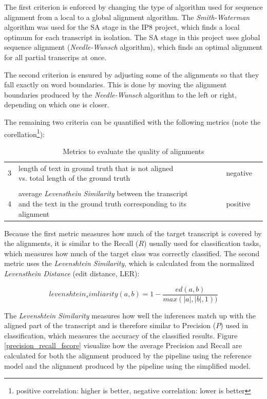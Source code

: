 The first criterion is enforced by changing the type of algorithm used for sequence alignment from a local to a global alignment algorithm. The \textit{Smith-Waterman} algorithm was used for the \ac{SA} stage in the IP8 project, which finds a local optimum for each transcript in isolation. The \ac{SA} stage in this project uses global sequence alignment (\textit{Needle-Wunsch} algorithm), which finds an optimal alignment for all partial transcrips at once.

The second criterion is ensured by adjusting some of the alignments so that they fall exactly on word boundaries. This is done by moving the alignment boundaries produced by the \textit{Needle-Wunsch} algorithm to the left or right, depending on which one is closer. 

The remaining two criteria can be quantified with the following metrics (note the corellation\footnote{positive correlation: higher is better, negative correlation: lower is better}):

\begin{table}[!htbp]
	\centering
	\begin{tabular}{llll}
		\toprule
		\thead{criterion} & \thead{metric} & \thead{correlation} \\
		\midrule
		3 & \makecell[l]{length of text in ground truth that is not aligned\\vs. total length of the ground truth} & negative\\ \\ 	
		4 & \makecell[l]{average \textit{Levensthein Similarity} between the transcript\\and the text in the ground truth corresponding to its alignment} & positive \\ 
		\bottomrule
	\end{tabular}
	\caption{Metrics to evaluate the quality of alignments}
	\label{alignment_quality}
\end{table}

Because the first metric measures how much of the target transcript is covered by the alignments, it is similar to the Recall ($R$) usually used for classification tasks, which measures how much of the target class was correctly classified. The second metric uses the \textit{Levenshtein Similarity}, which is calculated from the normalized \textit{Levensthein Distance} (edit distance, \ac{LER}):

\[ 
levenshtein_simliarity(a,b) = 1 - \frac{ed(a,b)}{max(|a|, |b|, 1))}
\]

The \textit{Levenshtein Similarity} measures how well the inferences match up with the aligned part of the transcript and is therefore similar to Precision ($P$) used in classification, which measures the accuracy of the classified results. Figure \ref{precision_recall_fscore} visualize how the average Precision and Recall are calculated for both the alignment produced by the pipeline using the reference model and the alignment produced by the pipeline using the simplified model.

